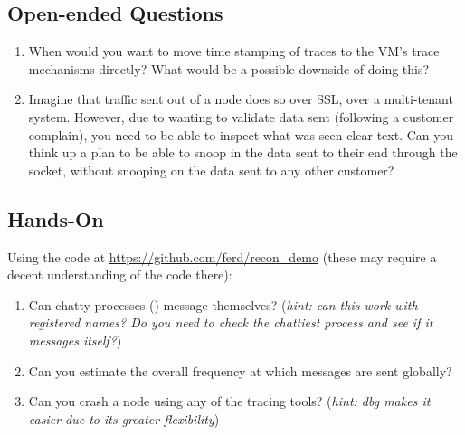 \subsection*{Open-ended Questions}

\begin{enumerate}
	\item When would you want to move time stamping of traces to the VM's trace mechanisms directly? What would be a possible downside of doing this?	
	\item Imagine that traffic sent out of a node does so over SSL, over a multi-tenant system. However, due to wanting to validate data sent (following a customer complain), you need to be able to inspect what was seen clear text. Can you think up a plan to be able to snoop in the data sent to their end through the  socket, without snooping on the data sent to any other customer?
\end{enumerate}

\subsection*{Hands-On}

Using the code at \href{https://github.com/ferd/recon\_demo}{https://github.com/ferd/recon\_demo} (these may require a decent understanding of the code there):

\begin{enumerate}
	\item Can chatty processes () message themselves? (\emph{hint: can this work with registered names? Do you need to check the chattiest process and see if it messages itself?})
	\item Can you estimate the overall frequency at which messages are sent globally?
	\item Can you crash a node using any of the tracing tools? (\emph{hint: dbg makes it easier due to its greater flexibility})
\end{enumerate}


